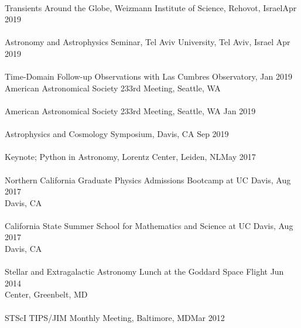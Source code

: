 \documentclass[10pt]{cv}
\begin{document}
\begin{llist}
\\
Transients Around the Globe, Weizmann Institute of Science, Rehovot, Israel\hfill Apr 2019\\ \vspace{-0.1in}  %
\\
Astronomy and Astrophysics Seminar, Tel Aviv University, Tel Aviv, Israel \hfill Apr 2019\\ \vspace{-0.1in}  %
\\
Time-Domain Follow-up Observations with Las Cumbres Observatory,   \hfill Jan 2019\\ 
American Astronomical Society 233rd Meeting, Seattle, WA \\ \vspace{-0.1in}  %
\\
American Astronomical Society 233rd Meeting,  Seattle, WA \hfill Jan 2019\\\vspace{-0.1in}  
\\
Astrophysics and Cosmology Symposium, Davis, CA \hfill Sep 2019\\\vspace{-0.1in}  
\\
Keynote; Python in Astronomy, Lorentz Center, Leiden, NL\hfill May 2017\\ \vspace{-0.1in}  %
\\
Northern California Graduate Physics Admissions Bootcamp at UC Davis, \hfill Aug 2017\\ 
Davis, CA\\ \vspace{-0.1in}  %
\\
California State Summer School for Mathematics and Science at UC Davis, \hfill Aug 2017\\ 
 Davis, CA \\ \vspace{-0.1in}  %
\\
Stellar and Extragalactic Astronomy Lunch at the Goddard Space Flight  \hfill Jun 2014\\  
Center, Greenbelt, MD \\ \vspace{-0.1in}  %
\\
STScI TIPS/JIM Monthly Meeting, Baltimore, MD\hfill Mar 2012\\\vspace{-0.1in}  

\end{llist}
\end{document}
